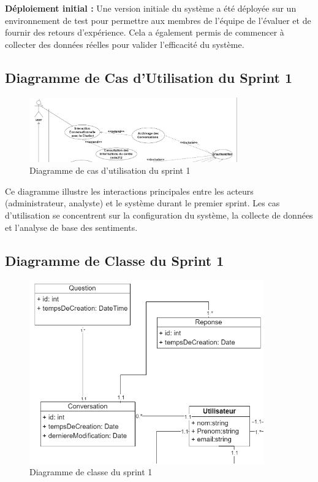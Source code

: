 \textbf{Déploiement initial :} Une version initiale du système a été déployée sur un environnement de test pour permettre aux membres de l'équipe de l'évaluer et de fournir des retours d'expérience. Cela a également permis de commencer à collecter des données réelles pour valider l'efficacité du système.

\subsection{Diagramme de Cas d'Utilisation du Sprint 1}

\begin{figure}[H]
\centering
\includegraphics[width=0.8\textwidth]{assets/images/sprint1-usecase.png}
\caption{Diagramme de cas d'utilisation du sprint 1}
\label{fig:sprint1-usecase}
\end{figure}

Ce diagramme illustre les interactions principales entre les acteurs (administrateur, analyste) et le système durant le premier sprint. Les cas d'utilisation se concentrent sur la configuration du système, la collecte de données et l'analyse de base des sentiments.

\subsection{Diagramme de Classe du Sprint 1}

\begin{figure}[H]
\centering
\includegraphics[width=0.9\textwidth]{assets/images/sprint1-class.png}
\caption{Diagramme de classe du sprint 1}
\label{fig:sprint1-class}
\end{figure}

